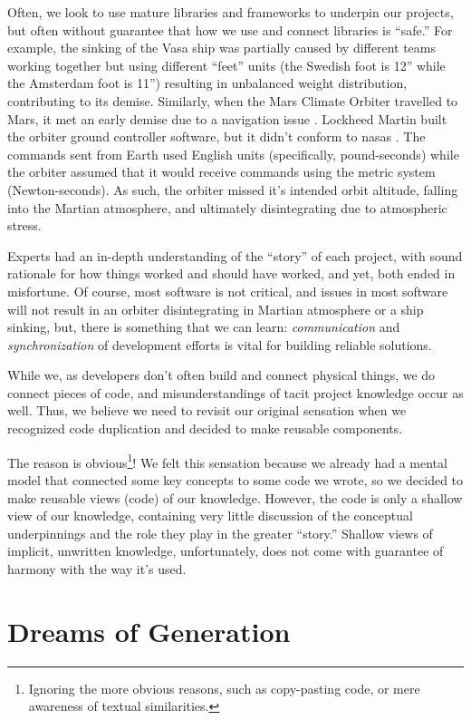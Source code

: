 Often, we look to use mature libraries and frameworks to underpin our projects,
but often without guarantee that how we use and connect libraries is ``safe.''
For example, the sinking of the Vasa ship \cite{wiki:Vasa_ship} was partially
caused by different teams working together but using different ``feet'' units
(the Swedish foot is 12'' while the Amsterdam foot is 11'') resulting in
unbalanced weight distribution, contributing to its demise. Similarly, when the
Mars Climate Orbiter travelled to Mars, it met an early demise due to a
navigation issue \cite{Siddiqi2018}. Lockheed Martin built the orbiter ground
controller software, but it didn't conform to \acsp{nasa} . The
commands sent from Earth used English units (specifically, pound-seconds) while
the orbiter assumed that it would receive commands using the metric system
(Newton-seconds). As such, the orbiter missed it's intended orbit altitude,
falling into the Martian atmosphere, and ultimately disintegrating due to
atmospheric stress.

Experts had an in-depth understanding of the ``story'' of each project, with
sound rationale for how things worked and should have worked, and yet, both
ended in misfortune. Of course, most software is not critical, and issues in
most software will not result in an orbiter disintegrating in Martian atmosphere
or a ship sinking, but, there is something that we can learn:
\textit{communication} and \textit{synchronization} of development efforts is
vital for building reliable solutions.

While we, as developers don't often build and connect physical things, we do
connect pieces of code, and misunderstandings of tacit project knowledge occur
as well. Thus, we believe we need to revisit our original sensation when we
recognized code duplication and decided to make reusable components.

The reason is obvious\footnote{Ignoring the more obvious reasons, such as
copy-pasting code, or mere awareness of textual similarities.}! We felt this
sensation because we already had a mental model that connected some key concepts
to some code we wrote, so we decided to make reusable views (code) of our
knowledge. However, the code is only a shallow view of our knowledge, containing
very little discussion of the conceptual underpinnings and the role they play in
the greater ``story.'' Shallow views of implicit, unwritten knowledge,
unfortunately, does not come with guarantee of harmony with the way it's used.

\section{Dreams of Generation}
\label{chap:ideology:sec:thoughts_of_generation}

